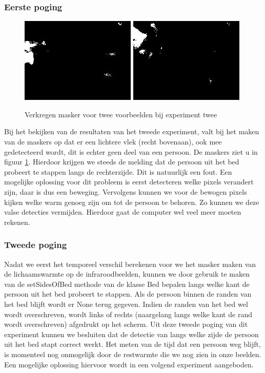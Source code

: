\subsubsection{Eerste poging}
\begin{figure}[hbp]
	\includegraphics[scale = 0.75]{MaskTweedeExperiment_img0}
	\includegraphics[scale = 0.75]{MaskTweedeExperiment_img4}
	\caption{Verkregen masker voor twee voorbeelden bij experiment twee}
	\label{imgCDUB}
\end{figure}
Bij het bekijken van de resultaten van het tweede experiment, valt bij het maken van de maskers op dat er een lichtere vlek (recht bovenaan), ook mee gedetecteerd wordt, dit is echter geen deel van een persoon. De maskers ziet u in figuur \ref{imgCDUB}.
Hierdoor krijgen we steeds de melding dat de persoon uit het bed probeert te stappen langs de rechterzijde. Dit is natuurlijk een fout. Een mogelijke oplossing voor dit probleem is eerst detecteren welke pixels verandert zijn, daar is dus een beweging. Vervolgens kunnen we voor de bewogen pixels kijken welke warm genoeg zijn om tot de persoon te behoren. Zo kunnen we deze valse detecties vermijden. Hierdoor gaat de computer wel veel meer moeten rekenen.

\subsubsection{Tweede poging}
Nadat we eerst het temporeel verschil berekenen voor we het masker maken van de lichaamswarmte op de infraroodbeelden, kunnen we door gebruik te maken van de setSidesOfBed methode van de klasse Bed bepalen langs welke kant de persoon uit het bed probeert te stappen. Als de persoon binnen de randen van het bed blijft wordt er None terug gegeven. Indien de randen van het bed wel wordt overschreven, wordt links of rechts (naargelang langs welke kant de rand wordt overschreven) afgedrukt op het scherm. Uit deze tweede poging van dit experiment kunnen we besluiten dat de detectie van langs welke zijde de persoon uit het bed stapt correct werkt. Het meten van de tijd dat een persoon weg blijft, is momenteel nog onmogelijk door de restwarmte die we nog zien in onze beelden. Een mogelijke oplossing hiervoor wordt in een volgend experiment aangeboden. 

